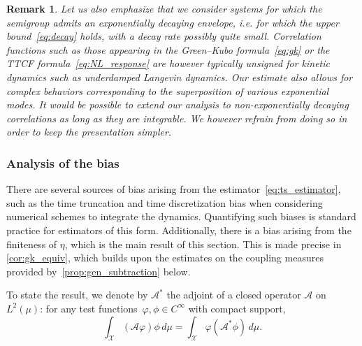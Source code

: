 \documentclass[11pt]{article}
\newtheorem{remark}{Remark}
\theoremstyle{definition}
\begin{document}
\begin{remark}
Let us also emphasize that we consider systems for which the semigroup admits an exponentially decaying envelope, \emph{i.e.} for which the upper bound~\eqref{eq:decay} holds, with a decay rate possibly quite small. Correlation functions such as those appearing in the Green--Kubo formula~\eqref{eq:gk} or the TTCF formula~\eqref{eq:NL_response} are however typically unsigned for kinetic dynamics such as underdamped Langevin dynamics. Our estimate also allows for complex behaviors corresponding to the superposition of various exponential modes. It would be possible to extend our analysis to non-exponentially decaying correlations as long as they are integrable. We however refrain from doing so in order to keep the presentation simpler.   
\end{remark}

\subsubsection{Analysis of the bias}
\label{subsubsec:bias_analysis}
There are several sources of bias arising from the estimator~\eqref{eq:ts_estimator}, such as the time truncation and time discretization bias when considering numerical schemes to integrate the dynamics. Quantifying such biases is standard practice for estimators of this form. Additionally, there is a bias arising from the finiteness of $\eta$, which is the main result of this section. This is made precise in \cref{cor:gk_equiv}, which builds upon the estimates on the coupling measures provided by~\cref{prop:gen_subtraction} below. 

To state the result, we denote by $\mathcal{A}^*$ the adjoint of a closed operator $\mathcal{A}$ on $L^2(\mu)$: for any test functions~$\varphi, \phi \in C^\infty$ with compact support,
\begin{equation}
    \int_\mathcal{X} (\mathcal{A}\varphi)\phi \, d\mu = \int_\mathcal{X} \varphi(\mathcal{A}^*\phi) \, d\mu.
    \label{eq:Astar_adjoint}
\end{equation}
\end{document}
